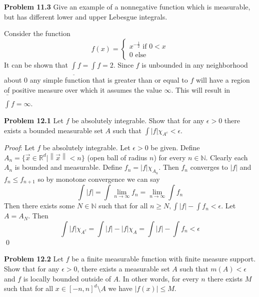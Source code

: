 \documentclass[12pt]{article}
\newcommand{\problem}[1]{\hspace{-4 ex} \large \textbf{Problem #1} }
\newcommand{\norm}[1]{\left\lVert#1\right\rVert}
\renewenvironment{proof}{\hspace{-4 ex} \emph{Proof}:}{\qed}
\begin{document}
\problem{11.3} Give an example of a nonnegative function which is measurable, but has different lower and upper Lebesgue integrals.

	Consider the function 
	\[
	f(x) = \begin{cases}
		x^{-\frac{1}{2}} \text{ if } 0<x\\
		0 \text{ else}
	\end{cases}
	\]
	It can be shown that $ \underline{\int}f = \int f = 2$. Since $f$ is unbounded in any neighborhood about $0$ any simple function that is greater than or equal to $f$ will have a region of positive measure over which it assumes the value $\infty$. This will result in $\bar{\int}f = \infty$.
	

\problem{12.1} Let $f$ be absolutely integrable. Show that for any $\epsilon>0$ there exists a bounded measurable set $A$ such that $\int |f|\chi_{A^c}<\epsilon$.

	\begin{proof}
		Let $f$ be absolutely integrable. Let $\epsilon > 0 $ be given. Define $A_n = \{ \vec{x} \in \mathbb{R}^d \vert \norm{\vec{x}} < n \}$ (open ball of radius $n$) for every $n \in \mathbb{N}$. Clearly each $A_n$ is bounded and measurable. Define $f_n = \vert f \vert \chi_{A_n}$. Then $f_n$ converges to $\vert f \vert$ and $f_n \leq f_{n+1}$ so by monotone convergence we can say 
		$$
		\int \vert f \vert = \int \lim_{n \to \infty}{f_n} = \lim_{n \to \infty} \int f_n
		$$
		Then there exists some $N \in \mathbb{N}$ such that for all $n \geq N, \int \vert f \vert - \int f_n < \epsilon$. Let $A = A_N$. Then 
		$$
		\int |f|\chi_{A^c} = \int \vert f \vert - |f|\chi_{A} = \int \vert f \vert - \int f_n < \epsilon 
		$$
	\end{proof}

\problem{12.2} Let $f$ be a finite measurable function with finite measure support. Show that for any $\epsilon>0$, there exists a measurable set $A$ such that $m(A)<\epsilon$ and $f$ is locally bounded outside of $A$. In other words, for every $n$ there exists $M$ such that for all $x\in[-n,n]^d\setminus A$ we have $ \vert f(x) \vert \leq M$.\bigbreak
\end{document}
